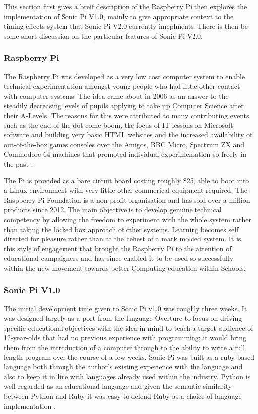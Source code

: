 \documentclass[11pt]{scrartcl}
\begin{document}
This section first gives a breif description of the Raspberry Pi then explores 
the implementation of Sonic Pi V1.0, mainly to give appropriate context to the 
timing effects system that Sonic Pi V2.0 currently imeplments. There is then 
be some short discussion on the particular features of Sonic Pi V2.0.

\subsubsection{Raspberry Pi}
The Raspberry Pi was developed as a very low cost computer system to enable 
technical experimentation amongst young people who had little other contact 
with computer systems. The idea came about in 2006 as an answer to the 
steadily decreasing levels of pupils applying to take up Computer Science 
after their A-Levels. The reasons for this were attributed to many 
contributing events such as the end of the dot come boom, the focus of IT 
lessons on Microsoft software and building very basic HTML websites and the 
increased availability of out-of-the-box games consoles over the Amigos, BBC 
Micro, Spectrum ZX and Commodore 64 machines that promoted individual 
experimentation so freely in the past \cite{rp}.

The Pi is provided as a bare circuit board costing roughly \$25, able to boot 
into a Linux environment with very little other commerical equipment required. 
The Raspberry Pi Foundation is a non-profit organisation and has sold over a 
million products since 2012. The main objective is to develop genuine 
technical competency by allowing the freedom to experiment with the whole 
system rather than taking the locked box approach of other systems. Learning 
becomes self directed for pleasure rather than at the behest of a mark molded 
system. It is this style of engagement that brought the Raspberry Pi to the 
attention of educational campaigners and has since enabled it to be used so 
successfully within the new movement towards better Computing education within 
Schools. 

\subsubsection{Sonic Pi V1.0}
The initial development time given to Sonic Pi v1.0 was roughly three weeks. 
It was designed largely as a port from the language Overture to focus on 
driving specific educational objectives with the idea in mind to teach a 
target audience of 12-year-olds that had no previous experience with 
programming; it would bring them from the introduction of a computer through 
to the ability to write a full length program over the course of a few weeks. 
Sonic Pi was built as a ruby-based language both through the author's existing 
experience with the language and also to keep it in line with languages 
already used within the industry. Python is well regarded as an educational 
language and given the semantic similarity between Python and Ruby it was easy 
to defend Ruby as a choice of language implementation \cite{AB13}. 
\end{document}
